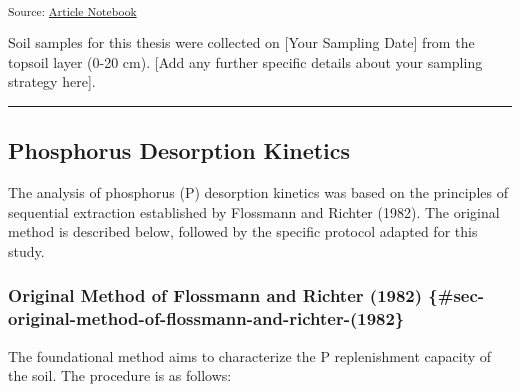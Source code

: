 \documentclass[
  a4paper,
]{article}
\begin{document}
\textsubscript{Source:
\href{https://Andrapodon.github.io/Master-Thesis-P-kinetics/index.qmd.html}{Article
Notebook}}

Soil samples for this thesis were collected on {[}Your Sampling Date{]}
from the topsoil layer (0-20 cm). {[}Add any further specific details
about your sampling strategy here{]}.

\begin{center}\rule{0.5\linewidth}{0.5pt}\end{center}

\subsection{Phosphorus Desorption
Kinetics}\label{sec-phosphorus-desorption-kinetics}

The analysis of phosphorus (P) desorption kinetics was based on the
principles of sequential extraction established by Flossmann and Richter
(1982). The original method is described below, followed by the specific
protocol adapted for this study.

\subsubsection{Original Method of Flossmann and Richter (1982)
\{\#sec-original-method-of-flossmann-and-richter-(1982\}}\label{original-method-of-flossmann-and-richter-1982-sec-original-method-of-flossmann-and-richter-1982}

The foundational method aims to characterize the P replenishment
capacity of the soil. The procedure is as follows:
\end{document}
